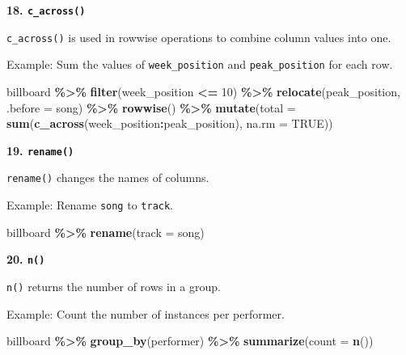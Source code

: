 \documentclass[
]{book}
\newenvironment{Shaded}{\begin{snugshade}}{\end{snugshade}}
\newcommand{\AttributeTok}[1]{\textcolor[rgb]{0.13,0.29,0.53}{#1}}
\newcommand{\ConstantTok}[1]{\textcolor[rgb]{0.56,0.35,0.01}{#1}}
\newcommand{\DecValTok}[1]{\textcolor[rgb]{0.00,0.00,0.81}{#1}}
\newcommand{\FunctionTok}[1]{\textcolor[rgb]{0.13,0.29,0.53}{\textbf{#1}}}
\newcommand{\NormalTok}[1]{#1}
\newcommand{\SpecialCharTok}[1]{\textcolor[rgb]{0.81,0.36,0.00}{\textbf{#1}}}
\begin{document}
\textbf{18. \texttt{c\_across()}}

\texttt{c\_across()} is used in rowwise operations to combine column values into one.

Example: Sum the values of \texttt{week\_position} and \texttt{peak\_position} for each row.

\begin{Shaded}
\begin{Highlighting}[]
\NormalTok{billboard }\SpecialCharTok{\%\textgreater{}\%}
  \FunctionTok{filter}\NormalTok{(week\_position }\SpecialCharTok{\textless{}=} \DecValTok{10}\NormalTok{) }\SpecialCharTok{\%\textgreater{}\%}
  \FunctionTok{relocate}\NormalTok{(peak\_position, }\AttributeTok{.before =}\NormalTok{ song) }\SpecialCharTok{\%\textgreater{}\%}
  \FunctionTok{rowwise}\NormalTok{() }\SpecialCharTok{\%\textgreater{}\%}
  \FunctionTok{mutate}\NormalTok{(}\AttributeTok{total =} \FunctionTok{sum}\NormalTok{(}\FunctionTok{c\_across}\NormalTok{(week\_position}\SpecialCharTok{:}\NormalTok{peak\_position), }\AttributeTok{na.rm =} \ConstantTok{TRUE}\NormalTok{))}
\end{Highlighting}
\end{Shaded}

\textbf{19. \texttt{rename()}}

\texttt{rename()} changes the names of columns.

Example: Rename \texttt{song} to \texttt{track}.

\begin{Shaded}
\begin{Highlighting}[]
\NormalTok{billboard }\SpecialCharTok{\%\textgreater{}\%}
  \FunctionTok{rename}\NormalTok{(}\AttributeTok{track =}\NormalTok{ song)}
\end{Highlighting}
\end{Shaded}

\textbf{20. \texttt{n()}}

\texttt{n()} returns the number of rows in a group.

Example: Count the number of instances per performer.

\begin{Shaded}
\begin{Highlighting}[]
\NormalTok{billboard }\SpecialCharTok{\%\textgreater{}\%}
  \FunctionTok{group\_by}\NormalTok{(performer) }\SpecialCharTok{\%\textgreater{}\%}
  \FunctionTok{summarize}\NormalTok{(}\AttributeTok{count =} \FunctionTok{n}\NormalTok{())}
\end{Highlighting}
\end{Shaded}
\end{document}

